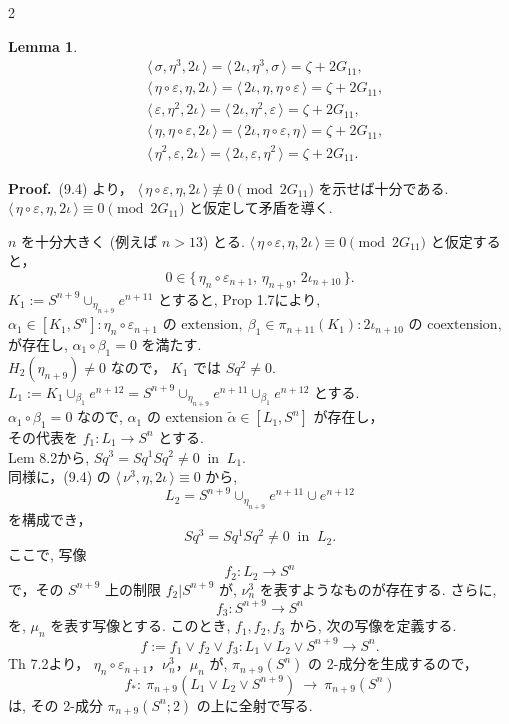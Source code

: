 \documentclass[10pt, leqno]{ltjsarticle}
\newcommand{\toda}[1]{\{\,#1\,\}}              %
\newcommand{\todas}[1]{\langle\,#1\,\rangle}
\newcommand{\pis}[2]{\pi_{#1}(#2)}       %
\numberwithin{equation}{section}
\theoremstyle{plain}
\newtheorem{lemma}[theorem]{Lemma}
\theoremstyle{definition}
\theoremstyle{remark}
\begin{document}
\begin{paracol}{2}

\begin{lemma}
\[
\begin{aligned}
&\todas{\sigma,\eta^{3},2\iota}=\todas{2\iota,\eta^{3},\sigma}=\zeta+2G_{11},\\
&\todas{\eta\circ\varepsilon,\eta,2\iota}=\todas{2\iota,\eta,\eta\circ\varepsilon}=\zeta+2G_{11},\\
&\todas{\varepsilon,\eta^{2},2\iota}=\todas{2\iota,\eta^{2},\varepsilon}=\zeta+2G_{11},\\
&\todas{\eta,\eta\circ\varepsilon,2\iota}=\todas{2\iota,\eta\circ\varepsilon,\eta}=\zeta+2G_{11},\\
&\todas{\eta^{2},\varepsilon,2\iota}=\todas{2\iota,\varepsilon,\eta^{2}}=\zeta+2G_{11}.
\end{aligned}
\]
\end{lemma}

\noindent
\textbf{Proof.}\
(9.4) より，
\(\todas{\eta\circ\varepsilon,\eta,2\iota}\not\equiv0\pmod{2G_{11}}\) 
を示せば十分である. \\
\(\todas{\eta\circ\varepsilon,\eta,2\iota}\equiv0\pmod{2G_{11}}\) 
と仮定して矛盾を導く. 

\(n\) を十分大きく (例えば \(n>13\)) とる. 
\(\todas{\eta\circ\varepsilon,\eta,2\iota}\equiv0\pmod{2G_{11}}\) 
と仮定すると，
\[
0 \in \toda{\eta_{n}\circ\varepsilon_{n+1},\,\eta_{n+9},\,2\iota_{n+10}}.
\] 
\(K_{1}:=S^{n+9}\cup_{\eta_{n+9}} e^{n+11}\) 
とすると, Prop 1.7により,\\
\(
\alpha_{1}\in[K_{1}, S^{n}]:\eta_{n}\circ\varepsilon_{n+1} \text{ の extension},\
\beta_{1}\in\pi_{n+11}(K_{1}):2\iota_{n+10} \text{ の coextension},
\)\\
が存在し, 
\(\alpha_1\circ\beta_1 = 0\)
を満たす.\\
\(H_{2}(\eta_{n+9})\neq0\) なので，
\(K_{1}\) では \(Sq^{2}\neq0\). \\
\(L_{1} := K_{1}\cup_{\beta_1} e^{n+12} 
= S^{n+9} \cup_{\eta_{n+9}} e^{n+11} \cup_{\beta_1} e^{n+12}\)
とする.\\
\(\alpha_{1}\circ\beta_{1}=0\) なので,  \(\alpha_{1}\) の extension 
\(\widetilde{\alpha}\in[L_{1}, S^{n}]\) が存在し，\\
その代表を 
\(f_{1}:L_{1}\to S^{n}\) 
とする. \\
Lem 8.2から, 
\(Sq^{3}=Sq^{1}Sq^{2}\neq0 \ \text{ in }\ L_1.\)\\
同様に，(9.4) の \(\todas{\nu^{3},\eta,2\iota}\equiv 0\) から, 
\[
L_{2}=S^{n+9}\cup_{\eta_{n+9}} e^{n+11}\cup e^{n+12}
\]
を構成でき，
\[
Sq^3=Sq^1Sq^2\ne0 \ \text{ in } \ L_2.
\]
ここで, 写像
\[
f_2:L_2\to S^n
\]
で，その $S^{n+9}$ 上の制限 \(f_2|{S^{n+9}}\) が,
$\nu_n^3$ を表すようなものが存在する. さらに, 
\[
f_3:S^{n+9}\to S^n
\]
を, $\mu_n$ を表す写像とする. このとき, $f_1,f_2,f_3$ から, 
次の写像を定義する.
\[
f:= f_1\vee f_2\vee f_3 :L_1\vee L_2\vee S^{n+9}\longrightarrow S^n.
\]
Th 7.2より，
$\eta_n\circ\varepsilon_{n+1}$，$\nu_n^3$，$\mu_n$ が,
$\pi_{n+9}(S^n)$ の 2-成分を生成するので，
\[
f_*:\ \pi_{n+9}(L_1\vee L_2\vee S^{n+9})\ \longrightarrow\ \pi_{n+9}(S^n)
\]
は, その 2-成分 \(\pis{n+9}{S^n;2}\) の上に全射で写る. 


\end{paracol}
\end{document}
